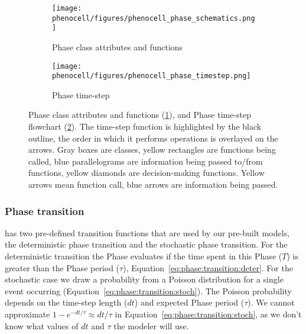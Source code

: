 \begin{figure}[!htpb]
    \centering
    \begin{subfigure}{.7\textwidth}
        \texttt{[image: phenocell/figures/phenocell\_phase\_schematics.png]}
        \caption{Phase class attributes and functions}\label{fig:schematics-phase:attr-ops}
    \end{subfigure}
    \begin{subfigure}{.7\textwidth}
        \texttt{[image: phenocell/figures/phenocell\_phase\_timestep.png]}
        \caption{Phase time-step}\label{fig:schematics-phase:time}
    \end{subfigure}
    \caption{Phase class attributes and functions (\ref{fig:schematics-phase:attr-ops}), and Phase time-step flowchart (\ref{fig:schematics-phase:time}). The time-step function is highlighted by the black outline, the order in which it performs operations is overlayed on the arrows. Gray boxes are \pcps classes, yellow rectangles are functions being called, blue parallelograms are information being passed to/from functions, yellow diamonds are decision-making functions. Yellow arrows mean function call, blue arrows are information being passed.}
    \label{fig:schematics-phase}
\end{figure}


\subsubsection{Phase transition}\label{sec:meth:phase:trans}
\pcp\space has two pre-defined transition functions that are used by our pre-built models, the deterministic phase transition and the stochastic phase transition. For the deterministic transition the Phase evaluates if the time spent in this Phase ($T$) is greater than the Phase period ($\tau$), Equation~\ref{eq:phase:transition:deter}. For the stochastic case we draw a probability from a Poisson distribution for a single event occurring (Equation~\ref{eq:phase:transition:stoch}). The Poisson probability depends on the time-step length ($dt$) and expected Phase period ($\tau$). We cannot approximate $1 - e^{- dt / \tau}\approx dt/\tau$ in Equation~\ref{eq:phase:transition:stoch}, as we don't know what values of $dt$ and $\tau$ the modeler will use.

